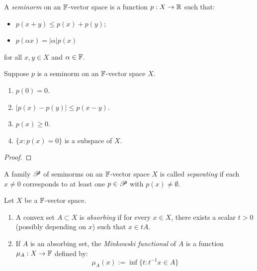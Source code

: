 \begin{definition}
	A \emph{seminorm} on an $\mathbb{F}$-vector space is a function $p:X \rightarrow \mathbb{R}$ such that:
	\mbox{}
	\begin{itemize}[itemsep=1pt,topsep=3pt]
		\item $p(x+y) \leq p(x) + p(y)$;
		\item $p(\alpha x ) = |\alpha| p(x)$
	\end{itemize}
	for all $x,y \in X$ and $\alpha \in \mathbb{F}$.
\end{definition}

\begin{proposition}
	Suppose $p$ is a seminorm on an $\mathbb{F}$-vector space $X$.
	\mbox{}
	\begin{enumerate}[label = (\alph*),itemsep=1pt,topsep=3pt]
		\item $p(0)=0$.
		\item $|p(x)-p(y)| \leq p(x-y)$.
		\item $p(x) \geq 0$.
		\item $\{x:p(x) = 0\}$ is a  subspace of $X$.
	\end{enumerate}
\end{proposition}
	{\color{red}
	\begin{proof}
		
	\end{proof}}

\begin{definition}
	A family $\mathscr{P}$ of seminorms on an $\mathbb{F}$-vector space $X$ is called \emph{separating} if each $x\neq 0$ corresponds to at least one $p \in \mathscr{P}$ with $p(x)\neq \emptyset $.
\end{definition}

\begin{definition}
	Let $X$ be a $\mathbb{F}$-vector space.
	\mbox{}
	\begin{enumerate}[label = (\alph*),itemsep=1pt,topsep=3pt]
		\item A convex set $A \subset X$ is \emph{absorbing} if for every $x \in X$, there exists a scalar $t > 0$ (possibly depending on $x$) such that $x \in tA$.
		\item If $A$ is an absorbing set, the \emph{Minkowski functional} of $A$ is a function $\mu_A:X \rightarrow \mathbb{F}$ defined by:			\[
			\mu_A(x) := \inf \{t : t^{-1}x \in A\}
		\] 
	\end{enumerate}
\end{definition}

